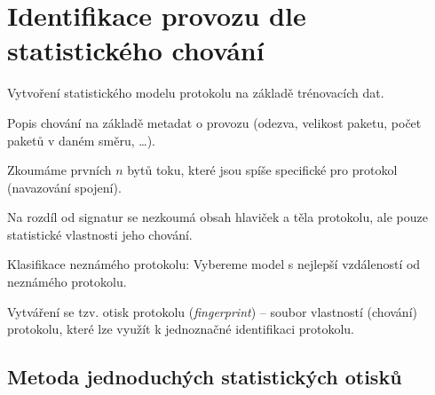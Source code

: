 
\section{Identifikace provozu dle statistického chování}

\begin{compactitem}
    \item Vytvoření statistického modelu protokolu na základě trénovacích dat. \begin{compactitem}
        \item Popis chování na základě metadat o provozu (odezva, velikost paketu, počet paketů v daném směru, \dots).
        \item Zkoumáme prvních $n$ bytů toku, které jsou spíše specifické pro protokol (navazování spojení).
        \item Na rozdíl od signatur se nezkoumá obsah hlaviček a těla protokolu, ale pouze statistické vlastnosti jeho chování.
    \end{compactitem}
    \item
    \item Klasifikace neznámého protokolu: Vybereme model s nejlepší vzdáleností od neznámého protokolu.
    \item Vytváření se tzv. otisk protokolu (\textit{fingerprint}) -- soubor vlastností (chování) protokolu, které lze
    využít k jednoznačné identifikaci protokolu.
\end{compactitem}

\subsection*{Metoda jednoduchých statistických otisků}

